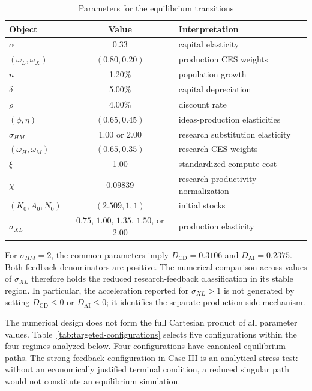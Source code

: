 \begin{table}[H]
    \centering
    \caption{Parameters for the equilibrium transitions}
    \label{tab:equilibrium-numerical-parameters}
    \begin{tabular}{lcl}
        \toprule
        Object & Value & Interpretation \\
        \midrule
        $\alpha$ & 0.33 & capital elasticity \\
        $(\omega_L,\omega_X)$ & $(0.80,0.20)$ & production CES weights \\
        $n$ & 1.20\% & population growth \\
        $\delta$ & 5.00\% & capital depreciation \\
        $\rho$ & 4.00\% & discount rate \\
        $(\phi,\eta)$ & $(0.65,0.45)$ & ideas-production elasticities \\
        $\sigma_{HM}$ & 1.00 or 2.00 & research substitution elasticity \\
        $(\omega_H,\omega_M)$ & $(0.65,0.35)$ & research CES weights \\
        $\xi$ & 1.00 & standardized compute cost \\
        $\chi$ & 0.09839 & research-productivity normalization \\
        $(K_0,A_0,N_0)$ & $(2.509,1,1)$ & initial stocks \\
        $\sigma_{XL}$ & $0.75$, $1.00$, $1.35$, $1.50$, or $2.00$ & production elasticity \\
        \bottomrule
    \end{tabular}
\end{table}

For $\sigma_{HM}=2$, the common parameters imply
$D_{\mathrm{CD}}=0.3106$ and $D_{\mathrm{AI}}=0.2375$. Both feedback
denominators are positive. The numerical comparison across values of
$\sigma_{XL}$ therefore holds the reduced research-feedback classification in its
stable region. In particular, the acceleration reported for $\sigma_{XL}>1$ is not
generated by setting $D_{\mathrm{CD}}\leq0$ or $D_{\mathrm{AI}}\leq0$; it identifies
the separate production-side mechanism.

The numerical design does not form the full Cartesian product of all parameter
values. Table~\ref{tab:targeted-configurations} selects five configurations within
the four regimes analyzed below. Four configurations have canonical equilibrium
paths. The strong-feedback configuration in Case III is an analytical stress test:
without an economically justified terminal condition, a reduced singular path
would not constitute an equilibrium simulation.

